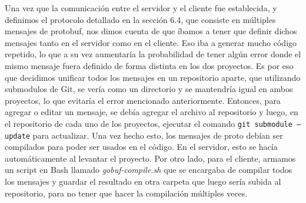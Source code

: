 Una vez que la comunicación entre el servidor y el cliente fue establecida, y definimos el protocolo detallado en la sección 6.4, que consiste en
múltiples mensajes de protobuf, nos dimos cuenta de que íbamos a tener que definir dichos mensajes tanto en el servidor como en el cliente. Eso iba
a generar mucho código repetido, lo que a su vez aumentaría la probabilidad de tener algún error donde el mismo mensaje fuera definido de
forma distinta en los dos proyectos. Es por eso que decidimos unificar todos los mensajes en un repositorio aparte, que utilizando submodulos
de Git, se vería como un directorio y se mantendría igual en ambos proyectos, lo que evitaría el error mencionado anteriormente.
Entonces, para agregar o editar un mensaje, se debía agregar el archivo al repositorio y luego, en el repositorio de cada uno de los proyectos, 
ejecutar el comando \texttt{git submodule --update} para actualizar. Una vez hecho esto, los mensajes de proto debían ser compilados para poder
ser usados en el código. En el servidor, esto se hacía automáticamente al levantar el proyecto. Por otro lado, para el cliente, armamos un
script en Bash llamado \textit{gobuf-compile.sh} que se encargaba de compilar todos los mensajes y guardar el resultado en otra carpeta que 
luego sería subida al repositorio, para no tener que hacer la compilación múltiples veces.

